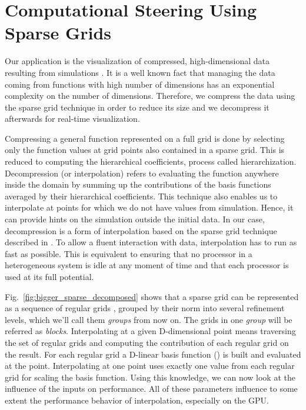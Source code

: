 \section{Computational Steering Using Sparse Grids}


Our application is the visualization of compressed, high-dimensional data
resulting from simulations \cite{butnaru2011}. It is a well known fact that
managing the data coming from functions with high number of dimensions has an
exponential complexity on the number of dimensions. Therefore, we compress the
data using the sparse grid technique in order to reduce its size and we
decompress it afterwards for real-time visualization. 

Compressing a general function represented on a full grid is done by selecting
only the function values at grid points also contained in a sparse grid. This is
reduced to computing the hierarchical coefficients, process called
hierarchization. Decompression (or interpolation) refers to evaluating the
function anywhere inside the domain by summing up the contributions of the basis
functions averaged by their hierarchical coefficients. This technique also
enables us to interpolate at points for which we do not have values from
simulation. Hence, it can provide hints on the simulation outside the initial
data. In our case, decompression is a form of interpolation based on the sparse
grid technique described in \cite{bungartz2004}. To allow a fluent interaction
with data, interpolation has to run as fast as possible. This is equivalent to
ensuring that no processor in a heterogeneous system is idle at any moment of
time and that each processor is used at its full potential.

Fig.~\ref{fig:bigger_sparse_decomposed} shows that a sparse grid can be
represented as a sequence of regular grids \cite{murarasu2011}, grouped by their
norm into several refinement levels, which we'll call them \textit{groups} from
now on. The grids in one \textit{group} will be referred as \textit{blocks}.
Interpolating at a given D-dimensional point means traversing the set of regular
grids and computing the contribution of each regular grid on the result. For
each regular grid a D-linear basis function () is built and evaluated
at the point. Interpolating at one point uses exactly one value from each
regular grid for scaling the basis function. Using this knowledge, we can now
look at the influence of the inputs on performance. All of these parameters
influence to some extent the performance behavior of interpolation, especially
on the GPU.

